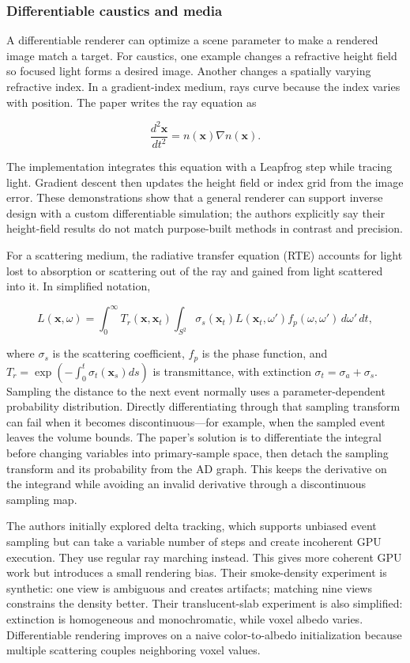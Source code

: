 \subsubsection{Differentiable caustics and media}\label{03-visual-computing-i-ch011-differentiable-caustics-and-media}

A differentiable renderer can optimize a scene parameter to make a rendered image match a target. For caustics, one example changes a refractive height field so focused light forms a desired image. Another changes a spatially varying refractive index. In a gradient-index medium, rays curve because the index varies with position. The paper writes the ray equation as

\[\frac{d^2\mathbf{x}}{dt^2}=n(\mathbf{x})\nabla n(\mathbf{x}).\]

The implementation integrates this equation with a Leapfrog step while tracing light. Gradient descent then updates the height field or index grid from the image error. These demonstrations show that a general renderer can support inverse design with a custom differentiable simulation; the authors explicitly say their height-field results do not match purpose-built methods in contrast and precision.

For a scattering medium, the radiative transfer equation (RTE) accounts for light lost to absorption or scattering out of the ray and gained from light scattered into it. In simplified notation,

\[L(\mathbf{x},\omega)=\int_0^\infty T_r(\mathbf{x},\mathbf{x}_t)\int_{S^2}\sigma_s(\mathbf{x}_t)L(\mathbf{x}_t,\omega')f_p(\omega,\omega')\,d\omega'\,dt,\]

where \(\sigma_s\) is the scattering coefficient, \(f_p\) is the phase function, and \(T_r=\exp(-\int_0^t\sigma_t(\mathbf{x}_s)ds)\) is transmittance, with extinction \(\sigma_t=\sigma_a+\sigma_s\). Sampling the distance to the next event normally uses a parameter-dependent probability distribution. Directly differentiating through that sampling transform can fail when it becomes discontinuous---for example, when the sampled event leaves the volume bounds. The paper's solution is to differentiate the integral before changing variables into primary-sample space, then detach the sampling transform and its probability from the AD graph. This keeps the derivative on the integrand while avoiding an invalid derivative through a discontinuous sampling map.

The authors initially explored delta tracking, which supports unbiased event sampling but can take a variable number of steps and create incoherent GPU execution. They use regular ray marching instead. This gives more coherent GPU work but introduces a small rendering bias. Their smoke-density experiment is synthetic: one view is ambiguous and creates artifacts; matching nine views constrains the density better. Their translucent-slab experiment is also simplified: extinction is homogeneous and monochromatic, while voxel albedo varies. Differentiable rendering improves on a naive color-to-albedo initialization because multiple scattering couples neighboring voxel values.

